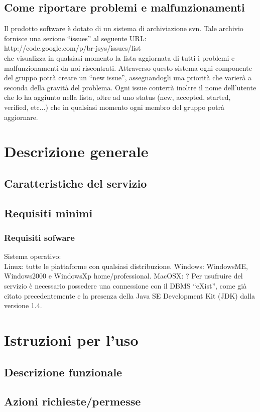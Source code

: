 \documentclass[11pt,titlepage,a4paper]{report}
\begin{document}
\section{Come riportare problemi e malfunzionamenti}
Il prodotto software \`e dotato di un sistema di archiviazione svn. Tale archivio fornisce una sezione ``issues'' al seguente URL: \\
http://code.google.com/p/br-jsys/issues/list \\
che visualizza in qualsiasi momento la lista aggiornata di tutti i problemi e malfunzionamenti da noi riscontrati. Attraverso questo sistema ogni componente del gruppo potr\`a creare un ``new issue'', assegnandogli una priorit\`a che varier\`a a seconda della gravit\`a del problema. Ogni issue conterr\`a inoltre il nome dell'utente che lo ha aggiunto nella lista, oltre ad uno status (new, accepted, started, verified, etc...) che in qualsiasi momento ogni membro del gruppo potr\`a aggiornare. 
\chapter{Descrizione generale}
\section{Caratteristiche del servizio}
\section{Requisiti minimi}
\subsection{Requisiti sofware}
Sistema operativo:\\
Linux: tutte le piattaforme con qualsiasi distribuzione.
Windows: WindowsME, Windows2000 e WindowsXp home/professional.
MacOSX: ?
Per usufruire del servizio \`e necessario possedere una connessione con il DBMS ``eXist'', come gi\`a citato precedentemente e la presenza della Java SE Development Kit (JDK) dalla versione 1.4.
\chapter{Istruzioni per l'uso}
\section{Descrizione funzionale}
\section{Azioni richieste/permesse}
\end{document}
